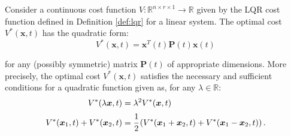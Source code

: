 \documentclass[a4paper,11pt]{book}
\numberwithin{figure}{chapter}
\numberwithin{equation}{chapter}
\numberwithin{table}{chapter}
\newtheorem{theorem}{Theorem}[chapter]
\theoremstyle{definition}
\newcounter{boxed-theorem}
\newenvironment{boxed-theorem}[1]
{\colorlet{shadecolor}{pastelBlue2!5} \begin{shaded} \begin{theorem}{#1}}
{\end{theorem} \end{shaded}}
\newcounter{boxed-lemma}
\newcounter{boxed-definition}
\newcounter{boxed-example}
\begin{document}
\begin{boxed-theorem}{} \label{th:costQuadraForm}
    Consider a continuous cost function $V : \mathbb{R}^{n \times r \times 1} \rightarrow \mathbb{R}$ given by the LQR cost function defined in Definition \ref{def:lqr} for a linear system. The optimal cost $V^*(\bm{x}, t)$ has the quadratic form:
    \begin{equation}
        V^*(\bm{x}, t) = \bm{x}^T(t) \bm{P}(t) \bm{x}(t)
    \end{equation}
    
\noindent for any (possibly symmetric) matrix $\bm{P}(t)$ of appropriate dimensions. More precisely, the optimal cost $V^*(\bm{x}, t)$ satisfies the necessary and sufficient conditions for a quadratic function given as, for any $\lambda \in \mathbb{R}$:
    \begin{align} 
        V^*(\lambda \bm{x}, t) &= \lambda^2 V^*(\bm{x}, t) \label{eq:costQuadraForm021} \\ 
        V^*(\bm{x}_1 , t) + V^*(\bm{x}_2 , t) &= \cfrac{1}{2} \left( V^*(\bm{x}_1 + \bm{x}_2 , t) + V^*(\bm{x}_1 - \bm{x}_2 , t) \right) \label{eq:costQuadraForm022}
    .\end{align}
\end{boxed-theorem}
\end{document}
